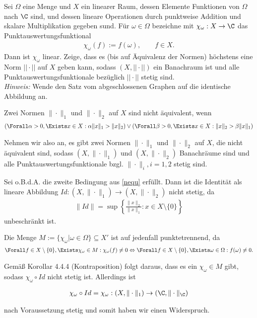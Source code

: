 \begin{exercise}
Sei $\Omega$ eine Menge und $X$ ein linearer Raum, dessen Elemente Funktionen von
$\Omega$ nach $\C$ sind, und dessen lineare Operationen durch punktweise Addition
und skalare Multiplikation gegeben sund. Für $\omega \in \Omega$ bezeichne mit
$\chi_{\omega}: X \rightarrow \C$ das Punktauswertungsfunktional
\begin{align*}
  \chi_{\omega}(f) := f(\omega), \qquad f \in X.
\end{align*}
Dann ist $\chi_{\omega}$ linear. Zeige, dass es (bis auf Äquivalenz der Normen)
höchstens eine Norm $||\cdot||$ auf $X$ geben kann, sodass $(X,||\cdot||)$ ein
Banachraum ist und alle Punktauswertungsfunktionale bezüglich $||\cdot||$ stetig sind. \\
\textit{Hinweis:} Wende den Satz vom abgeschlossenen Graphen auf die identische Abbildung an.
\end{exercise}
\begin{solution}
Zwei Normen $\|\cdot \|_1$ und $\|\cdot \|_2$ auf $X$ sind nicht äquivalent, wenn
\begin{align}\label{nequ}
  (\Forall \alpha > 0,\Exists x \in X: \alpha \|x \|_1 > \|x \|_2) \lor (\Forall \beta > 0,\Exists x \in X: \|x \|_2 > \beta \|x \|_1)
\end{align}
\newline

Nehmen wir also an, es gibt zwei Normen $\|\cdot \|_1$ und $\|\cdot \|_2$ auf $X$, die nicht äquivalent sind, sodass $(X,\|\cdot \|_1)$ und $(X,\|\cdot \|_2)$ Banachräume sind und alle Punktauswertungsfunktionale bzgl. $\|\cdot \|_i, i = 1,2$ stetig sind.

Sei o.B.d.A. die zweite Bedingung aus \eqref{nequ} erfüllt. Dann ist die Identität als lineare Abbildung $Id:(X,\|\cdot \|_1) \to (X,\|\cdot \|_2)$ nicht stetig, da
\begin{align*}
  \|Id\| = \sup \left \{\frac{\|x\|_2}{\|x\|_1}: x \in X \setminus \{0\} \right \}
\end{align*}
unbeschränkt ist.

Die Menge $M := \{\chi_\omega | \omega \in \Omega\} \subseteq X'$ ist auf jedenfall punktetrennend, da
\begin{align*}
  \Forall f \in X \setminus \{0\}, \Exists \chi_\omega \in M: \chi_\omega(f) \neq 0 \Leftrightarrow \Forall f \in X \setminus \{0\}, \Exists \omega \in \Omega: f(\omega) \neq 0 .
\end{align*}

Gemäß Korollar 4.4.4 (Kontraposition) folgt daraus, dass es ein $\chi_\omega \in M$ gibt, sodass $\chi_\omega \circ Id$ nicht stetig ist. Allerdings ist

\begin{align*}
  \chi_\omega \circ Id = \chi_\omega: (X,\|\cdot \|_1) \to (\C, \|\cdot \|_\C)
\end{align*}

nach Voraussetzung stetig und somit haben wir einen Widerspruch.

\end{solution}
